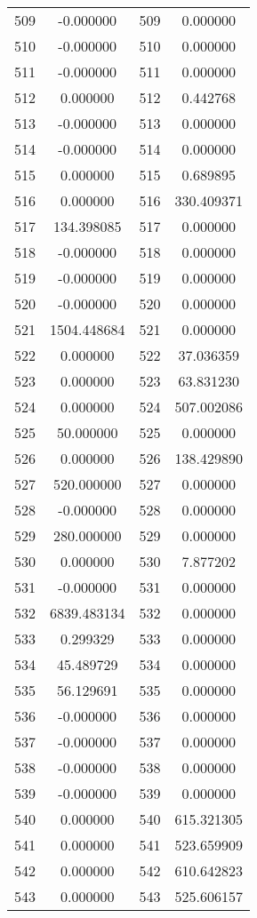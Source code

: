 \documentclass[12pt]{article}
\begin{document}
\begin{longtable}{@{}cccc@{}}
509 & -0.000000 & 509 & 0.000000 \\
510 & -0.000000 & 510 & 0.000000 \\
511 & -0.000000 & 511 & 0.000000 \\
512 & 0.000000 & 512 & 0.442768 \\
513 & -0.000000 & 513 & 0.000000 \\
514 & -0.000000 & 514 & 0.000000 \\
515 & 0.000000 & 515 & 0.689895 \\
516 & 0.000000 & 516 & 330.409371 \\
517 & 134.398085 & 517 & 0.000000 \\
518 & -0.000000 & 518 & 0.000000 \\
519 & -0.000000 & 519 & 0.000000 \\
520 & -0.000000 & 520 & 0.000000 \\
521 & 1504.448684 & 521 & 0.000000 \\
522 & 0.000000 & 522 & 37.036359 \\
523 & 0.000000 & 523 & 63.831230 \\
524 & 0.000000 & 524 & 507.002086 \\
525 & 50.000000 & 525 & 0.000000 \\
526 & 0.000000 & 526 & 138.429890 \\
527 & 520.000000 & 527 & 0.000000 \\
528 & -0.000000 & 528 & 0.000000 \\
529 & 280.000000 & 529 & 0.000000 \\
530 & 0.000000 & 530 & 7.877202 \\
531 & -0.000000 & 531 & 0.000000 \\
532 & 6839.483134 & 532 & 0.000000 \\
533 & 0.299329 & 533 & 0.000000 \\
534 & 45.489729 & 534 & 0.000000 \\
535 & 56.129691 & 535 & 0.000000 \\
536 & -0.000000 & 536 & 0.000000 \\
537 & -0.000000 & 537 & 0.000000 \\
538 & -0.000000 & 538 & 0.000000 \\
539 & -0.000000 & 539 & 0.000000 \\
540 & 0.000000 & 540 & 615.321305 \\
541 & 0.000000 & 541 & 523.659909 \\
542 & 0.000000 & 542 & 610.642823 \\
543 & 0.000000 & 543 & 525.606157 \\

\end{longtable}
\end{document}
